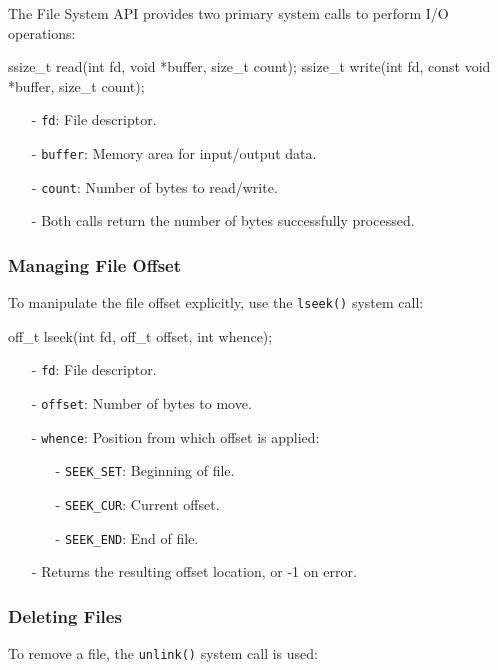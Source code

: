 The File System API provides two primary system calls to perform I/O operations:

\begin{cc}
ssize_t read(int fd, void *buffer, size_t count);
ssize_t write(int fd, const void *buffer, size_t count);
\end{cc}
\begin{itemize}[itemsep=2pt, topsep=1pt]
  \item[-] \texttt{fd}: File descriptor.
  \item[-] \texttt{buffer}: Memory area for input/output data.
  \item[-] \texttt{count}: Number of bytes to read/write.
  \item[-] Both calls return the number of bytes successfully processed.
\end{itemize}
\newpage
\subsubsection{Managing File Offset}

To manipulate the file offset explicitly, use the \texttt{lseek()} system call:

\begin{cc}
off_t lseek(int fd, off_t offset, int whence);
\end{cc}
\begin{itemize}[itemsep=2pt, topsep=1pt]
  \item[-] \texttt{fd}: File descriptor.
  \item[-] \texttt{offset}: Number of bytes to move.
  \item[-] \texttt{whence}: Position from which offset is applied:
    \begin{itemize}[itemsep=2pt, topsep=1pt]
      \item[-]\texttt{SEEK\_SET}: Beginning of file.
      \item[-] \texttt{SEEK\_CUR}: Current offset.
      \item[-] \texttt{SEEK\_END}: End of file.
    \end{itemize}
  \item[-] Returns the resulting offset location, or -1 on error.
\end{itemize}

\subsubsection{Deleting Files}

To remove a file, the \texttt{unlink()} system call is used:

